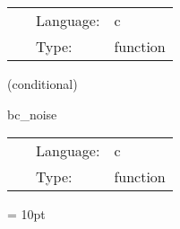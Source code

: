 \hspace{5mm}{\it add noise to boundary condition } 


\hspace{5mm}

 \begin{tabular*}{160mm}{cll} 
~ & Language:  & c \\ 
~ & Type:  & function \\ 
\end{tabular*} 


\vspace{5mm}

   (conditional) 

\hspace{5mm} bc\_noise 

\hspace{5mm}{\it add noise to boundary condition } 


\hspace{5mm}

 \begin{tabular*}{160mm}{cll} 
~ & Language:  & c \\ 
~ & Type:  & function \\ 
\end{tabular*} 



\vspace{5mm}\parskip = 10pt 
